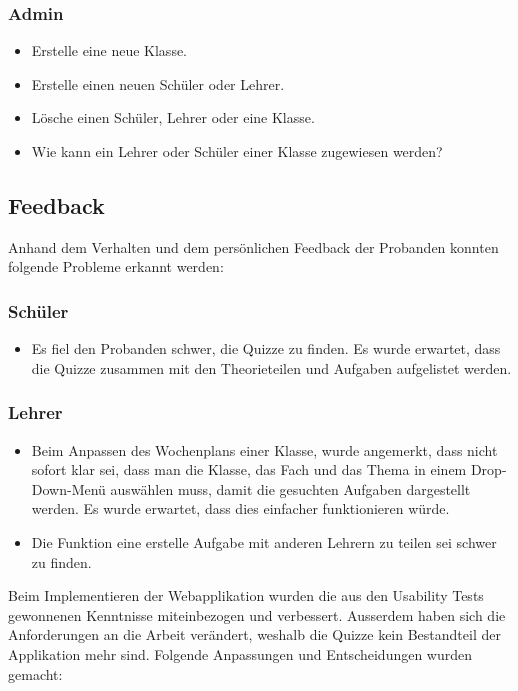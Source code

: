 \subsubsection*{Admin}
\begin{itemize}
	\item Erstelle eine neue Klasse.
	\item Erstelle einen neuen Schüler oder Lehrer.
	\item Lösche einen Schüler, Lehrer oder eine Klasse.
	\item Wie kann ein Lehrer oder Schüler einer Klasse zugewiesen werden?
\end{itemize} 

\subsection*{Feedback}
Anhand dem Verhalten und dem persönlichen Feedback der Probanden konnten folgende Probleme erkannt werden:

\subsubsection*{Schüler}
\begin{itemize}
	\item Es fiel den Probanden schwer, die Quizze zu finden. Es wurde erwartet, dass die Quizze zusammen mit den Theorieteilen und Aufgaben aufgelistet werden.
\end{itemize}

\subsubsection*{Lehrer}
\begin{itemize}
	\item Beim Anpassen des Wochenplans einer Klasse, wurde angemerkt, dass nicht sofort klar sei, dass man die Klasse, das Fach und das Thema in einem Drop-Down-Menü auswählen muss, damit die gesuchten Aufgaben dargestellt werden. Es wurde erwartet, dass dies einfacher funktionieren würde.
	\item Die Funktion eine erstelle Aufgabe mit anderen Lehrern zu teilen sei schwer zu finden.
\end{itemize}

Beim Implementieren der Webapplikation wurden die aus den Usability Tests gewonnenen Kenntnisse miteinbezogen und verbessert. Ausserdem haben sich die Anforderungen an die Arbeit verändert, weshalb die Quizze kein Bestandteil der Applikation mehr sind. Folgende Anpassungen und Entscheidungen wurden gemacht: \\

